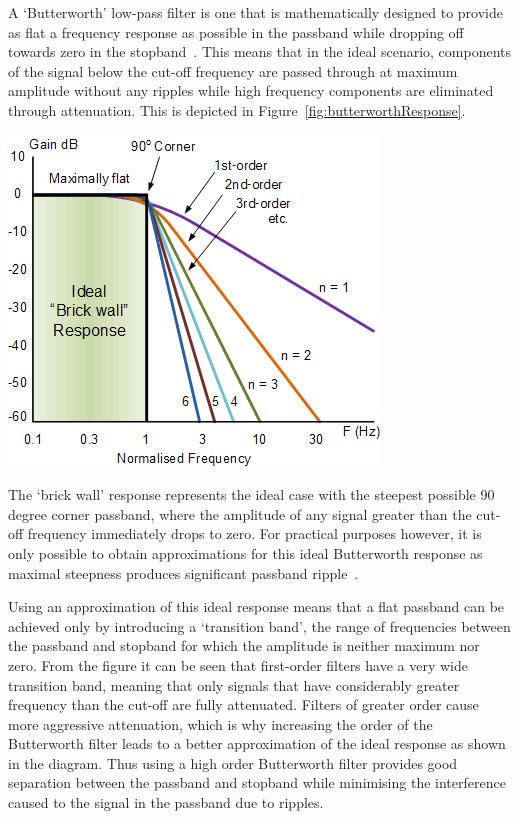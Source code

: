 \documentclass[12pt,a4paper]{report}
\begin{document}
A `Butterworth' low-pass filter is one that is mathematically designed to provide as flat a frequency response as possible in the passband while dropping off towards zero in the stopband~\cite[p.17]{bianchi2007electronic}. This means that in the ideal scenario, components of the signal below the cut-off frequency are passed through at maximum amplitude without any ripples while high frequency components are eliminated through attenuation. This is depicted in Figure~\ref{fig:butterworthResponse}.   

\begin{center}
\includegraphics[scale=0.9]{images/butterworthResponse.png}
\label{fig:butterworthResponse}
\end{center}
The `brick wall' response represents the ideal case with the steepest possible 90 degree corner passband, where the amplitude of any signal greater than the cut-off frequency immediately drops to zero. For practical purposes however, it is only possible to obtain approximations for this ideal Butterworth response as maximal steepness produces significant passband ripple~\cite{butterworthResponse}. 

Using an approximation of this ideal response means that a flat passband can be achieved only by introducing a `transition band', the range of frequencies between the passband and stopband for which the amplitude is neither maximum nor zero. From the figure it can be seen that first-order filters have a very wide transition band, meaning that only signals that have considerably greater frequency than the cut-off are fully attenuated. Filters of greater order cause more aggressive attenuation, which is why increasing the order of the Butterworth filter leads to a better approximation of the ideal response as shown in the diagram. Thus using a high order Butterworth filter provides good separation between the passband and stopband while minimising the interference caused to the signal in the passband due to ripples.    
\end{document}

